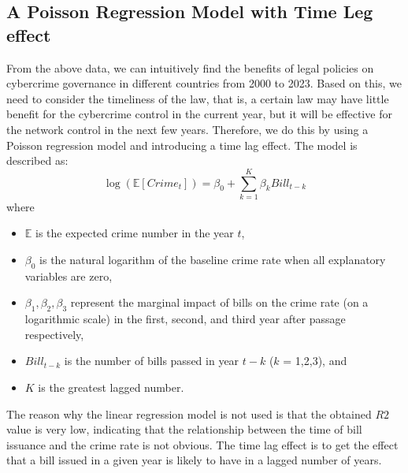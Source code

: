 \subsection{A Poisson Regression Model with Time Leg effect}\label{subsec:a-poisson-regression-model-with-time-leg-effect} %
    From the above data,
    we can intuitively find the benefits of legal policies on cybercrime governance in different countries from 2000 to 2023.
    Based on this, we need to consider the timeliness of the law, that is,
    a certain law may have little benefit for the cybercrime control in the current year,
    but it will be effective for the network control in the next few years.
    Therefore, we do this by using a Poisson regression model and introducing a time lag effect.
    The model is described as:
    \[ \log(\mathbb{E}[Crime_t]) = \beta_0 + \sum_{k=1}^{K} \beta_k Bill_{t-k} \]
    where
    \begin{itemize}
        \item \(\mathbb{E}\) is the expected crime number in the year \(t\),
        \item \(\beta_0\) is the natural logarithm of the baseline crime rate when all explanatory variables are zero,
        \item \(\beta_1, \beta_2, \beta_3\) represent the marginal impact of bills on the crime rate (on a logarithmic scale)
            in the first, second, and third year after passage respectively,
        \item \(Bill_{t-k}\) is the number of bills passed in year \(t-k\) (\(k\) = 1,2,3), and
        \item \(K\) is the greatest lagged number.
    \end{itemize}

    The reason why the linear regression model is not used is that the obtained \(R2\) value is very low,
    indicating that the relationship between the time of bill issuance and the crime rate is not obvious.
    The time lag effect is to get the effect that a bill issued in a given year is likely to have in a lagged number of years.

